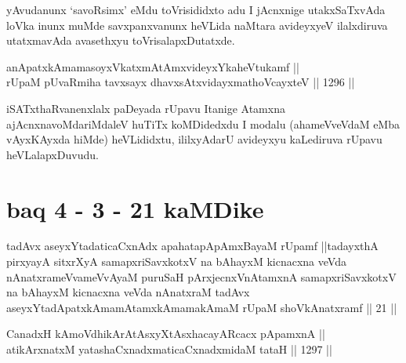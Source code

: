 \begin{artha}
yAvudanunx `savoR\s simx' eMdu toVrisididxto adu I jAcnxnige utakxSaTxvAda loVka inunx muMde savxpanxvanunx heVLida naMtara avideyxyeV ilalxdiruva utatxmavAda avasethxyu toVrisalapxDutatxde.
\end{artha}


\begin{shl}
\footnotemark[2]anApatxkAmamasoyxVkatxmAtAmxvideyxYkaheVtukamf || \\
rUpaM pUvaRmiha tavxsayx dhavxsAtxvidayxmathoVcayxteV ||  1296 ||  
\end{shl}

\begin{artha}
iSATxthaRvanenxlalx paDeyada rUpavu Itanige Atamxna ajAcnxnavoMdariMdaleV huTiTx koMDidedxdu I modalu (ahameVveVdaM eMba vAyxKAyxda hiMde) heVLididxtu, ililxyAdarU avideyxyu kaLediruva rUpavu heVLalapxDuvudu.
\end{artha}


\section*{baq 4 - 3 - 21 kaMDike}

\begin{shl}
tadAvx aseyxYtadaticaCxnAdx apahatapApAmxBayaM rUpamf ||tadayxthA pirxyayA sitxrXyA samapxriSavxkotxV na bAhayxM kicnacxna veVda nAnatxrameVvameVvAyaM puruSaH pArxjecnxVnAtamxnA samapxriSavxkotxV na bAhayxM kicnacxna veVda nAnatxraM tadAvx aseyxYtadApatxkAmamAtamxkAmamakAmaM rUpaM shoVkAnatxramf || 21 ||
\end{shl}


\begin{shl}
\footnotemark[1]CanadxH kAmoV\s dhikArAtAsxyXtAsxhacayARcacx pApamxnA || \\
atikArxnatxM yatashaCxnadxmaticaCxnadxmidaM tataH || 1297 ||  
\end{shl}

